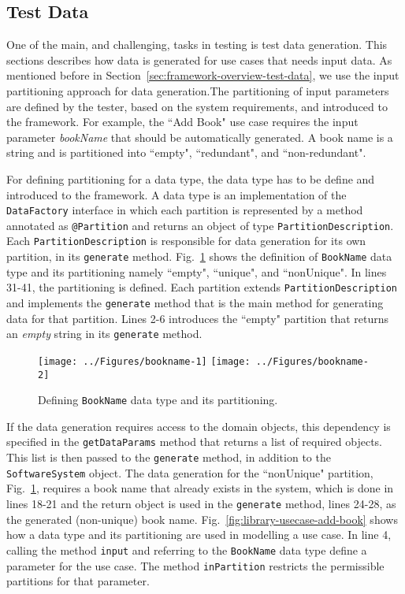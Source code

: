 \subsection{Test Data}
\label{sec:create-test model-data}
One of the main, and challenging, tasks in testing is test data generation. This sections describes how data is generated for use cases that needs input data. As mentioned before in Section~\ref{sec:framework-overview-test-data}, we use the input partitioning approach for data generation.The partitioning of input parameters are defined by the tester, based on the system requirements, and introduced to the framework. For example, the ``Add Book" use case requires the input parameter \textit{bookName} that should be automatically generated. A book name is a string and is partitioned into ``empty", ``redundant", and ``non-redundant".

For defining partitioning for a data type, the data type has to be define and introduced to the framework. A data type is an implementation of the \texttt{DataFactory} interface in which each partition is represented by a method annotated as \texttt{@Partition} and returns an object of type \texttt{PartitionDescription}. Each \texttt{PartitionDescription} is responsible for data generation for its own partition, in its \texttt{generate} method. Fig.~\ref{fig:library-bookname} shows the definition of \texttt{BookName} data type and its partitioning namely ``empty", ``unique", and ``nonUnique". In lines 31-41, the partitioning is defined. Each partition extends  \texttt{PartitionDescription} and implements the \texttt{generate} method that is the main method for generating data for that partition. Lines 2-6 introduces the ``empty" partition that returns an \textit{empty} string in its \texttt{generate} method.

\begin{figure}[h]
\centering
{\texttt{[image: ../Figures/bookname-1]}%
\label{fig:library-bookname-1}}
\hfil
{\texttt{[image: ../Figures/bookname-2]}%
\label{fig:library-bookname-2}}
\caption{Defining \texttt{BookName} data type and its partitioning.}
\label{fig:library-bookname}
\end{figure} 

If the data generation requires access to the domain objects, this dependency is specified in the \texttt{getDataParams} method that returns a list of required objects. This list is then passed to the \texttt{generate} method, in addition to the \texttt{SoftwareSystem} object. The data generation for the ``nonUnique" partition, Fig.~\ref{fig:library-bookname}, requires a book name that already exists in the system, which is done in lines 18-21 and the return object is used in the \texttt{generate} method, lines 24-28, as the generated (non-unique) book name. Fig.~\ref{fig:library-usecase-add-book} shows how a data type and its partitioning are used in modelling a use case. In line 4, calling the method \texttt{input} and referring to the \texttt{BookName} data type define a parameter for the use case. The method \texttt{inPartition} restricts the permissible partitions for that parameter.

